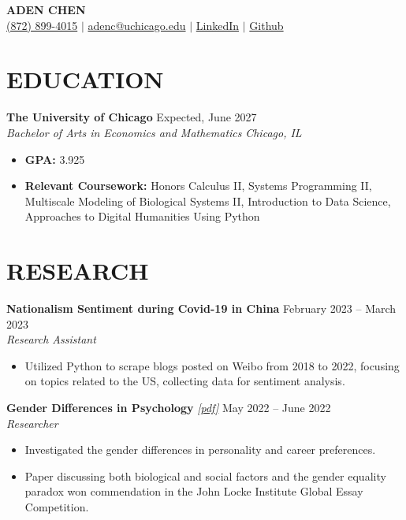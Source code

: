 \documentclass[letterpaper, 9pt]{extarticle}
\begin{document}
\pagestyle{empty}

\begin{center}
    \textbf{\Large ADEN CHEN} \\
    \href{tel:(872) 899-4015}{\faMobile\space (872) 899-4015}
    $|$
    \href{mailto:adenc@uchicago.edu}{\faAt\space adenc@uchicago.edu}
    $|$
    \href{https://www.linkedin.com/in/aden-chen-45a924221/}{\faLinkedinSquare \space LinkedIn}
    $|$
    \href{https://github.com/AdenChen27}{\faGithub\space Github}
\end{center}

\section*{EDUCATION}
\noindent
\textbf{The University of Chicago} \hfill Expected, June 2027 \\ 
\textit{Bachelor of Arts in Economics and Mathematics} \hfill \textit{Chicago, IL}
\begin{itemize}
    \item\textbf{GPA:} 3.925 
    \item\textbf{Relevant Coursework:} Honors Calculus II, Systems Programming II, Multiscale Modeling of Biological Systems II, Introduction to Data Science, Approaches to Digital Humanities Using Python
\end{itemize}

\section*{RESEARCH}
\noindent
\textbf{Nationalism Sentiment during Covid-19 in China} 
\hfill February 2023 -- March 2023 \\
\textit{Research Assistant} 
\begin{itemize}
    \item Utilized Python to scrape blogs posted on Weibo from 2018 to 2022, focusing on topics related to the US, collecting data for sentiment analysis.
\end{itemize}

\noindent
\textbf{Gender Differences in Psychology}
\emph{\href{https://drive.google.com/file/d/19cO9fOI9KPIAT2OV0WPENLVXvrM-A7fZ/view?usp=sharing}{\color{blue} [pdf]}} 
\hfill May 2022 -- June 2022 \\
\textit{Researcher} 
\begin{itemize}
    \item Investigated the gender differences in personality and career preferences. 
    \item Paper discussing both biological and social factors and the gender equality paradox won commendation in the John Locke Institute Global Essay Competition.
\end{itemize}
\end{document}
